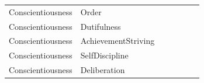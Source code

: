 \documentclass{article}\usepackage[]{graphicx}\usepackage[]{color}
\begin{document}
\begin{table}
\begin{tabular}[t]{lllllll}
Conscientiousness & Order & \cellcolor{white}{0.39} & \cellcolor{white}{-0.08} & \cellcolor{yellow}{0.59} & \cellcolor{white}{0.03} & \cellcolor{white}{0.05}\\
Conscientiousness & Dutifulness & \cellcolor{yellow}{0.61} & \cellcolor{white}{-0.11} & \cellcolor{yellow}{0.52} & \cellcolor{white}{0.04} & \cellcolor{white}{0.03}\\
Conscientiousness & AchievementStriving & \cellcolor{yellow}{0.6} & \cellcolor{white}{-0.14} & \cellcolor{yellow}{0.52} & \cellcolor{white}{0.25} & \cellcolor{white}{0.11}\\
Conscientiousness & SelfDiscipline & \cellcolor{yellow}{0.57} & \cellcolor{white}{-0.28} & \cellcolor{yellow}{0.57} & \cellcolor{white}{0} & \cellcolor{white}{0.14}\\
Conscientiousness & Deliberation & \cellcolor{white}{0.46} & \cellcolor{white}{-0.06} & \cellcolor{yellow}{0.52} & \cellcolor{white}{-0.2} & \cellcolor{white}{0.19}\\
\bottomrule
\end{tabular}
\end{table}
\end{document}
